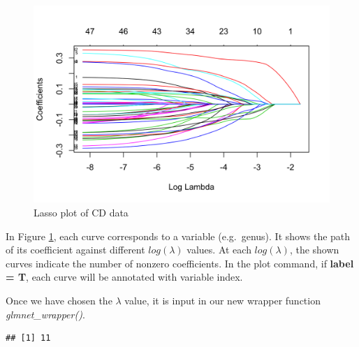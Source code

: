\documentclass[openany]{book}
\newenvironment{Shaded}{\begin{snugshade}}{\end{snugshade}}
\newcommand{\KeywordTok}[1]{\textcolor[rgb]{0.13,0.29,0.53}{\textbf{#1}}}
\newcommand{\DataTypeTok}[1]{\textcolor[rgb]{0.13,0.29,0.53}{#1}}
\newcommand{\FloatTok}[1]{\textcolor[rgb]{0.00,0.00,0.81}{#1}}
\newcommand{\StringTok}[1]{\textcolor[rgb]{0.31,0.60,0.02}{#1}}
\newcommand{\OperatorTok}[1]{\textcolor[rgb]{0.81,0.36,0.00}{\textbf{#1}}}
\newcommand{\NormalTok}[1]{#1}
\begin{document}
\begin{figure}

{\centering \includegraphics[width=1\linewidth]{./Generated_plots/CDlasso-1} 

}

\caption{Lasso plot of CD data}\label{fig:CDlasso}
\end{figure}

In Figure \ref{fig:CDlasso}, each curve corresponds to a variable
(e.g.~genus). It shows the path of its coefficient against different
\(log(\lambda)\) values. At each \(log(\lambda)\), the shown curves
indicate the number of nonzero coefficients. In the plot command, if
\textbf{label = T}, each curve will be annotated with variable index.

Once we have chosen the \(\lambda\) value, it is input in our new
wrapper function \emph{glmnet\_wrapper()}.

\begin{Shaded}
\end{Shaded}

\begin{verbatim}
## [1] 11
\end{verbatim}
\end{document}
